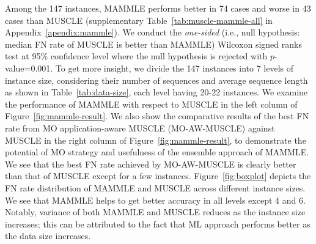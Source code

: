 

Among the 147 instances, MAMMLE performs better in 74 cases and worse in 43 cases than MUSCLE (supplementary Table~\ref{tab:muscle-mammle-all} in Appendix~\ref{apendix:mammle}). We conduct the \textit{one-sided} (i.e., null hypothesis: median FN rate of MUSCLE is better than MAMMLE) Wilcoxon signed ranks test at 95\% confidence level where the null hypothesis is rejected with $p$-value=0.001. To get more insight, we divide the 147 instances into 7 levels of instance size, considering their number of sequences and average sequence length as shown in Table~\ref{tab:data-size}, each level having 20-22 instances. We examine the performance of MAMMLE with respect to MUSCLE in the left column of Figure~\ref{fig:mammle-result}. We also show the comparative results of the best FN rate from MO application-aware MUSCLE (MO-AW-MUSCLE) against MUSCLE in the right column of Figure~\ref{fig:mammle-result}, to demonstrate the potential of MO strategy and usefulness of the ensemble approach of MAMMLE. We see that the best FN rate achieved by MO-AW-MUSCLE is clearly better than that of MUSCLE except for a few instances.
Figure~\ref{fig:boxplot} depicts the FN rate distribution of MAMMLE and MUSCLE across different instance sizes. We see that MAMMLE helps to get better accuracy in all levels except 4 and 6. Notably, variance of both MAMMLE and MUSCLE reduces as the instance size increases; this can be attributed to the fact that ML approach performs better as the data size increases. 

